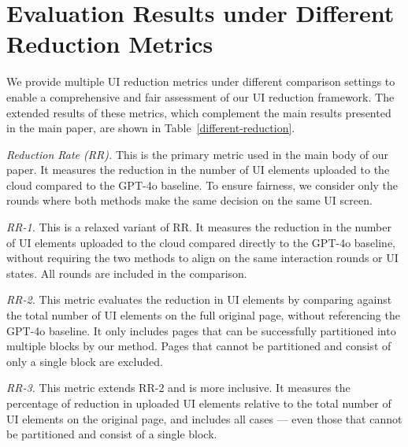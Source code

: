 \section{Evaluation Results under Different Reduction Metrics}
\label{sec:appendix-more-metrics}

We provide multiple UI reduction metrics under different comparison settings to enable a comprehensive and fair assessment of our UI reduction framework. The extended results of these metrics, which complement the main results presented in the main paper, are shown in Table~\ref{different-reduction}.

\textit{Reduction Rate (RR).}
This is the primary metric used in the main body of our paper. It measures the reduction in the number of UI elements uploaded to the cloud compared to the GPT-4o baseline. To ensure fairness, we consider only the rounds where both methods make the same decision on the same UI screen.

\textit{RR-1.}
This is a relaxed variant of RR. It measures the reduction in the number of UI elements uploaded to the cloud compared directly to the GPT-4o baseline, without requiring the two methods to align on the same interaction rounds or UI states. All rounds are included in the comparison.


\textit{RR-2.}
This metric evaluates the reduction in UI elements by comparing against the total number of UI elements on the full original page, without referencing the GPT-4o baseline. It only includes pages that can be successfully partitioned into multiple blocks by our method. Pages that cannot be partitioned and consist of only a single block are excluded.

\textit{RR-3.}
This metric extends RR-2 and is more inclusive. It measures the percentage of reduction in uploaded UI elements relative to the total number of UI elements on the original page, and includes all cases — even those that cannot be partitioned and consist of a single block.

\begin{table}[htbp]
  \caption{Extended results under different UI reduction metrics.}
  \label{different-reduction}
  \centering
\end{table}
